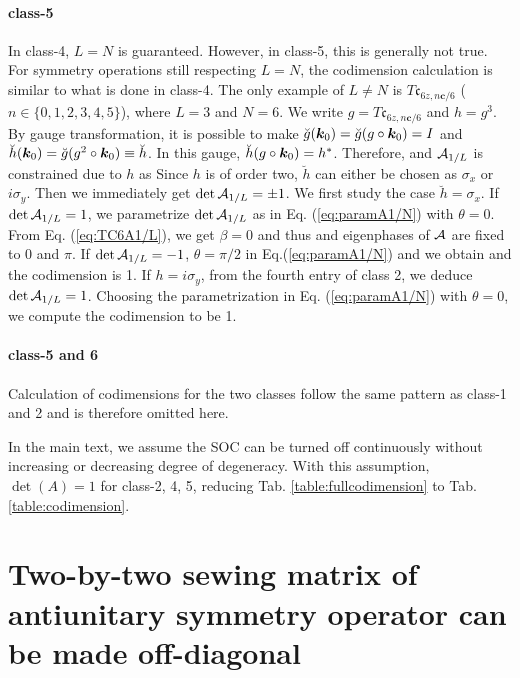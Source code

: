 \documentclass[aps, prb, showpacs, twocolumn, notitlepage, superscriptaddress]{revtex4-1}
\begin{document}
\paragraph*{class-5} In class-4, $L=N$ is guaranteed. However, in class-5, this is generally not true. For symmetry operations still respecting $L=N$, the codimension calculation is similar to what is done in class-4. The only example of $L\ne N$ is $T\mathfrak{c}_{6z,n\boldsymbol{c}/6}$ ($n\in\{0,1,2,3,4,5\}$), where $L=3$ and $N=6$. We write $g=T\mathfrak{c}_{6z,n\boldsymbol{c}/6}$ and $h=g^3$. By gauge transformation, it is possible to make $\breve{g}(\boldsymbol{k}_0)=\breve{g}(g\circ\boldsymbol{k}_0)=I$ and $\breve{h}(\boldsymbol{k}_0)=\breve{g}(g^2\circ \boldsymbol{k}_0)\equiv\breve{h}$. In this gauge, $\breve{h}(g\circ\boldsymbol{k}_0)=h^*$. Therefore,
and ${\cal A}_{1/L}$ is constrained due to $h$ as 
Since $h$ is of order two, $\breve{h}$ can either be chosen as $\sigma_x$ or $i\sigma_y$. Then we immediately get $\det {\cal A}_{1/L} = \pm 1$. We first study the case $\breve{h}=\sigma_x$. If $\det {\cal A}_{1/L} = 1$, we parametrize $\det {\cal A}_{1/L}$ as in Eq. (\ref{eq:paramA1/N}) with $\theta=0$. From Eq. (\ref{eq:TC6A1/L}), we get $\beta=0$ and thus 
and eigenphases of ${\cal A}$ are fixed to $0$ and $\pi$. If $\det{{\cal A}_{1/L}}=-1$, $\theta=\pi/2$ in Eq.(\ref{eq:paramA1/N}) and we obtain
and the codimension is 1. If $h=i\sigma_y$, from the fourth entry of class 2, we deduce $\det {\cal A}_{1/L}=1$. Choosing the parametrization in Eq. (\ref{eq:paramA1/N}) with $\theta=0$, we compute the codimension to be 1.

\paragraph*{class-5 and 6} Calculation of codimensions for the two classes follow the same pattern as class-1 and 2 and is therefore omitted here.

In the main text, we assume the SOC can be turned off continuously without increasing or decreasing degree of degeneracy. With this assumption, $\det(A)=1$ for class-2, 4, 5, reducing Tab. \ref{table:fullcodimension} to Tab. \ref{table:codimension}.

\section{Two-by-two sewing matrix of antiunitary symmetry operator can be made off-diagonal\label{app:makinggoffdiagonal}}
\end{document}
